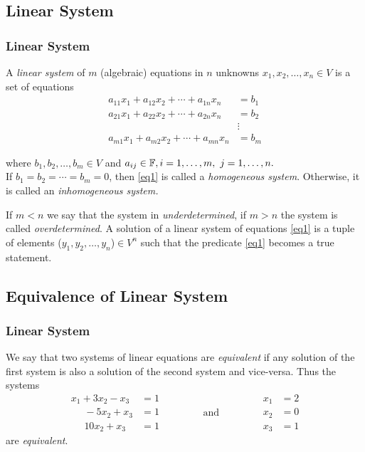 \documentclass[12pt, t]{beamer}
\renewcommand{\emph}[1]{{\color{Turquoise3}\textsl{#1}}}
\newcommand{\myseries}[2]{$#1_1,#1_2,\dots,#1_#2$}
\begin{document}
\subsection{Linear System}
\begin{frame}
    \frametitle{Linear System}

    A \emph{linear system} of $m$ (algebraic) equations in $n$ unknowns \myseries{x}{n}$\in V$ is a set of equations
    \begin{equation}
        \begin{aligned}
            a_{11}x_1+a_{12}x_2+\cdots+a_{1n}x_n & =b_1   \\
            a_{21}x_1+a_{22}x_2+\cdots+a_{2n}x_n & =b_2   \\
                                                 & \vdots \\
            a_{m1}x_1+a_{m2}x_2+\cdots+a_{mn}x_n & =b_m
        \end{aligned}
        \label{eq1}
    \end{equation}

    where \myseries{b}{m}$\in V$ and $a_{ij}\in\mathbb{F},i=1,\ldots,m,~j=1,\ldots,n.$\\
    If $b_1=b_2=\cdots=b_m=0$, then \eqref{eq1} is called a \emph{homogeneous system}. Otherwise, it is called an \emph{inhomogeneous system.}

    If $m<n$ we say that the system in \emph{underdetermined}, if $m>n$ the system is called \emph{overdetermined}.
    A solution of a linear system of equations \eqref{eq1} is a tuple of elements (\myseries{y}{n})$\in V^n$ such that the predicate \eqref{eq1} becomes a true statement.\\[3pt]
\end{frame}

\subsection{Equivalence of Linear System}
\begin{frame}
    \frametitle{Linear System}
    We say that two systems of linear equations are \emph{equivalent} if any solution
    of the first system is also a solution of the second system and vice-versa.
    Thus the systems
    \begin{equation*}
        \begin{aligned}
            x_1+3x_2-x_3    & =1 \\
            ~~~~~~-5x_2+x_3 & =1 \\
            ~~~~~~10x_2+x_3 & =1
        \end{aligned}
        \qquad\qquad\text{and}\qquad\qquad
        \begin{aligned}
            x_1 & =2 \\x_2&=0\\x_3&=1
        \end{aligned}
    \end{equation*} are \emph{equivalent}.
\end{frame}
\end{document}
